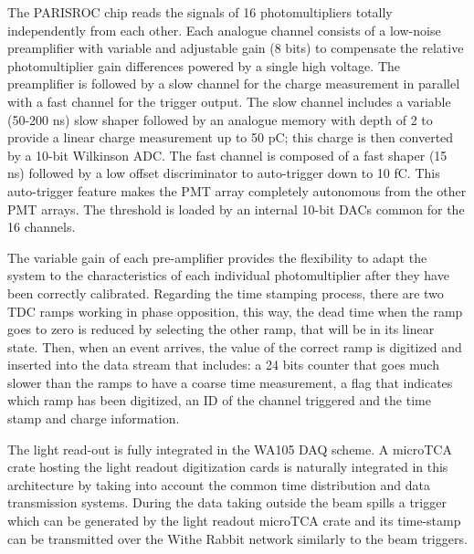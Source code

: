 The PARISROC chip reads the signals of 16 photomultipliers totally independently from each other. Each analogue channel consists of a low-noise preamplifier with variable and adjustable gain (8 bits) to compensate the relative photomultiplier gain differences powered by a single high voltage. The preamplifier is followed by a slow channel for the charge measurement in parallel with a fast channel for the trigger output. The slow channel includes a variable (50-200 ns) slow shaper followed by an analogue memory with depth of 2 to provide a linear charge measurement up to 50 pC; this charge is then converted by a 10-bit Wilkinson ADC. The fast channel is composed of a fast shaper (15 ns) followed by a low offset discriminator to auto-trigger down to 10 fC. This auto-trigger feature makes the PMT array completely autonomous from the other PMT arrays. The threshold is loaded by an internal 10-bit DACs common for the 16 channels.


The variable gain of each pre-amplifier provides the flexibility to adapt the system to the characteristics of each individual photomultiplier after they have been correctly calibrated. Regarding the time stamping process, there are two TDC ramps working in phase opposition, this way, the dead time when the ramp goes to zero is reduced by selecting the other ramp, that will be in its linear state. Then, when an event arrives, the value of the correct ramp is digitized and inserted into the data stream that includes: a 24 bits counter that goes much slower than the ramps to have a coarse time measurement, a flag that indicates which ramp has been digitized, an ID of the channel triggered and the time stamp and charge information.


The light read-out is fully integrated in the WA105 DAQ scheme. A microTCA crate hosting the light readout digitization cards is naturally integrated in this architecture by taking into account the common time distribution and data transmission systems.  During the data taking outside the beam spills a trigger which can be generated by the light readout microTCA crate and its time-stamp can be transmitted over the Withe Rabbit network similarly to the beam triggers. 

